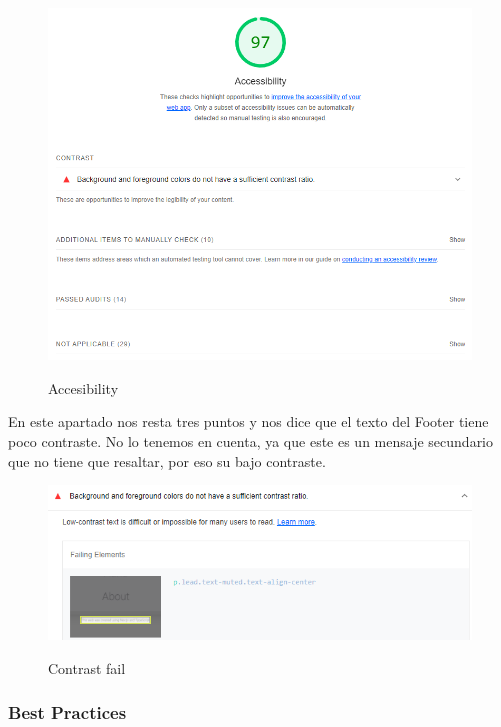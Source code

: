 \documentclass[12pt,twoside,titlepage]{report}
\begin{document}
\begin{figure}[H]
    \centering
    \includegraphics[scale=0.6]{Lighthouse/Accesibility}
    \label{fig:Lighthouse_accesibility}
    \caption{Accesibility}
\end{figure}

En este apartado nos resta tres puntos y nos dice que el texto del Footer tiene poco contraste. No lo tenemos en cuenta, ya que este es un mensaje secundario que no tiene que resaltar, por eso su bajo contraste.

\begin{figure}[H]
    \centering
    \includegraphics[scale=0.6]{Lighthouse/AccesibilityContrast}
    \label{fig:Lighthouse_contrast}
    \caption{Contrast fail}
\end{figure}

\subsubsection{Best Practices}
\end{document}
